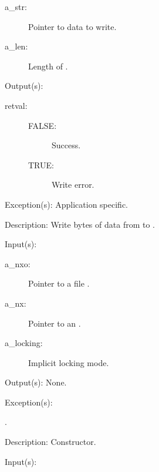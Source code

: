 \begin{capi}
\begin{capilist}
\begin{description}
		\item[a\_str: ]
			Pointer to data to write.
		\item[a\_len: ]
			Length of .
		\end{description}
	\item[Output(s): ]
		\begin{description}\item[]
		\item[retval: ]
			\begin{description}\item[]
			\item[FALSE: ]
				Success.
			\item[TRUE: ]
				Write error.
			\end{description}
		\end{description}
	\item[Exception(s): ] Application specific.
	\item[Description: ]
		Write  bytes of data from  to
		.
	\end{capilist}
\label{nxo_file_new}
	\begin{capilist}
	\item[Input(s): ]
		\begin{description}\item[]
		\item[a\_nxo: ]
			Pointer to a file .
		\item[a\_nx: ]
			Pointer to an .
		\item[a\_locking: ]
			Implicit locking mode.
		\end{description}
	\item[Output(s): ] None.
	\item[Exception(s): ]
		\begin{description}\item[]
		\item[.]
		\end{description}
	\item[Description: ]
		Constructor.
	\end{capilist}
\label{nxo_file_fd_wrap}
	\begin{capilist}
	\item[Input(s): ]

\end{capilist}
\end{capi}
